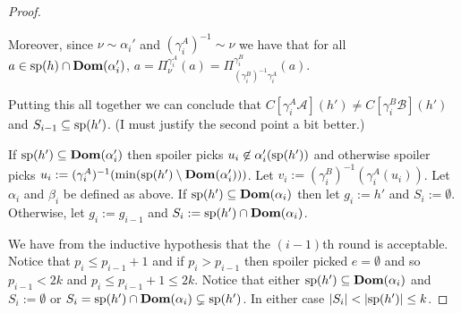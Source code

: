 \documentclass[../main/thesis.tex]{subfiles}
\begin{document}
\begin{proof}
\begin{enumerate}
    Moreover, since $\nu \sim \alpha_i'$ and $(\gamma^A_i)^{-1} \sim \nu$ we
    have that for all $a \in \text{sp}(h) \cap \text{\textbf{Dom}} (\alpha_i')$, $a =
    \Pi^{\gamma^A_i}_\nu (a) = \Pi^{\gamma^B_i}_{(\gamma^B_i)^{-1} \gamma^A_{i}}
    (a)$.
    
    Putting this all together we can conclude that $C[\gamma^A_i
    \mathcal{A}](h') \neq C[\gamma^{B}_i \mathcal{B}](h')$ and $S_{i-1}
    \subseteq \text{sp}(h')$. (I must justify the second point a bit better.)

    If $\text{sp}(h') \subseteq \text{\textbf{Dom}}(\alpha_i')$ then spoiler picks $u_i \not\in
    \alpha_i' (\text{sp}(h'))$ and otherwise spoiler picks $u_i :=
    (\gamma^A_i)^{-1}(\min (\text{sp}(h') \setminus \text{\textbf{Dom}}(\alpha_i')))$. Let $v_i :=
    (\gamma^B_i)^{-1}(\gamma^A_i(u_i))$. Let $\alpha_i$ and $\beta_i$ be defined
    as above. If $\text{sp}(h') \subseteq \text{\textbf{Dom}}(\alpha_i)$ then let $g_i := h'$ and
    $S_i := \emptyset$. Otherwise, let $g_i := g_{i-1}$ and $S_i := \text{sp}(h')
    \cap \text{\textbf{Dom}}(\alpha_i)$.


  \end{enumerate}

  We have from the inductive hypothesis that the $(i-1)$th round is acceptable.
  Notice that $p_i \leq p_{i-1} + 1$ and if $p_i > p_{i-1}$ then spoiler picked
  $e = \emptyset$ and so $p_{i-1} < 2k$ and $p_i \leq p_{i-1} + 1 \leq 2k$.
  Notice that either $\text{sp}(h') \subseteq \text{\textbf{Dom}}(\alpha_i)$ and $S_i :=
  \emptyset$ or $S_i = \text{sp}(h') \cap \text{\textbf{Dom}}(\alpha_{i}) \subsetneq \text{sp}(h')$.
  In either case $\vert S_i\vert < \vert \text{sp}(h')\vert \leq k$.


\end{proof}
\end{document}
